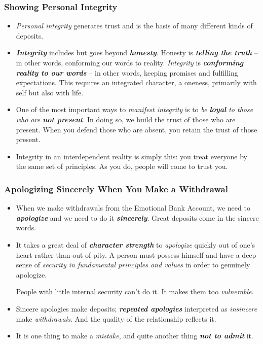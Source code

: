 \documentclass[11pt]{article}
\begin{document}
\subsubsection{Showing Personal Integrity}
\begin{itemize}
\item \emph{Personal integrity} generates trust and is the basis of many different kinds of deposits.

\item \emph{\textbf{Integrity}} includes but goes beyond \emph{\textbf{honesty}}. Honesty is \emph{\textbf{telling the truth}} -- in other words, conforming our words to reality. \emph{Integrity} is \emph{\textbf{conforming reality to our words}} -- in other words, keeping promises and fulfilling expectations. This requires an integrated character, a oneness, primarily with self but also with life.

\item One of the most important ways to \emph{manifest integrity} is to \emph{be \textbf{loyal} to those who are \textbf{not present}}. In doing so, we build the trust of those who are present. When you defend those who are absent, you retain the trust of those present.

\item  Integrity in an interdependent reality is simply this: you treat everyone by the same set of principles. As you do, people will come to trust you.
\end{itemize}
\subsubsection{Apologizing Sincerely When You Make a Withdrawal}
\begin{itemize}
\item When we make withdrawals from the Emotional Bank Account, we need to \emph{\textbf{apologize}} and we need to do it \emph{\textbf{sincerely}}. Great deposits come in the sincere words.

\item It takes a great deal of \emph{\textbf{character strength}} to \emph{apologize} quickly out of one's heart rather than out of pity. A person must possess himself and have a deep sense of \emph{security in fundamental principles and values} in order to genuinely apologize.

People with little internal security can't do it. It makes them too \emph{vulnerable}. 

\item Sincere apologies make deposits; \emph{\textbf{repeated apologies}} interpreted as \emph{insincere} make \emph{withdrawals}. And the quality of the relationship reflects it.

\item It is one thing to make a \emph{mistake}, and quite another thing \emph{\textbf{not to admit}} it. 
\end{itemize}
\end{document}
